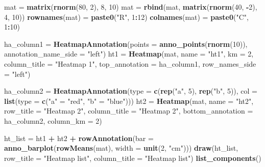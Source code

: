 \documentclass[]{book}
\newenvironment{Shaded}{\begin{snugshade}}{\end{snugshade}}
\newcommand{\KeywordTok}[1]{\textcolor[rgb]{0.13,0.29,0.53}{\textbf{#1}}}
\newcommand{\DataTypeTok}[1]{\textcolor[rgb]{0.13,0.29,0.53}{#1}}
\newcommand{\DecValTok}[1]{\textcolor[rgb]{0.00,0.00,0.81}{#1}}
\newcommand{\StringTok}[1]{\textcolor[rgb]{0.31,0.60,0.02}{#1}}
\newcommand{\OperatorTok}[1]{\textcolor[rgb]{0.81,0.36,0.00}{\textbf{#1}}}
\newcommand{\NormalTok}[1]{#1}
\theoremstyle{definition}
\theoremstyle{definition}
\theoremstyle{definition}
\theoremstyle{remark}
\begin{document}
\begin{Shaded}
\begin{Highlighting}[]
\NormalTok{mat =}\StringTok{ }\KeywordTok{matrix}\NormalTok{(}\KeywordTok{rnorm}\NormalTok{(}\DecValTok{80}\NormalTok{, }\DecValTok{2}\NormalTok{), }\DecValTok{8}\NormalTok{, }\DecValTok{10}\NormalTok{)}
\NormalTok{mat =}\StringTok{ }\KeywordTok{rbind}\NormalTok{(mat, }\KeywordTok{matrix}\NormalTok{(}\KeywordTok{rnorm}\NormalTok{(}\DecValTok{40}\NormalTok{, }\OperatorTok{-}\DecValTok{2}\NormalTok{), }\DecValTok{4}\NormalTok{, }\DecValTok{10}\NormalTok{))}
\KeywordTok{rownames}\NormalTok{(mat) =}\StringTok{ }\KeywordTok{paste0}\NormalTok{(}\StringTok{"R"}\NormalTok{, }\DecValTok{1}\OperatorTok{:}\DecValTok{12}\NormalTok{)}
\KeywordTok{colnames}\NormalTok{(mat) =}\StringTok{ }\KeywordTok{paste0}\NormalTok{(}\StringTok{"C"}\NormalTok{, }\DecValTok{1}\OperatorTok{:}\DecValTok{10}\NormalTok{)}

\NormalTok{ha_column1 =}\StringTok{ }\KeywordTok{HeatmapAnnotation}\NormalTok{(}\DataTypeTok{points =} \KeywordTok{anno_points}\NormalTok{(}\KeywordTok{rnorm}\NormalTok{(}\DecValTok{10}\NormalTok{)), }
    \DataTypeTok{annotation_name_side =} \StringTok{"left"}\NormalTok{)}
\NormalTok{ht1 =}\StringTok{ }\KeywordTok{Heatmap}\NormalTok{(mat, }\DataTypeTok{name =} \StringTok{"ht1"}\NormalTok{, }\DataTypeTok{km =} \DecValTok{2}\NormalTok{, }\DataTypeTok{column_title =} \StringTok{"Heatmap 1"}\NormalTok{, }
    \DataTypeTok{top_annotation =}\NormalTok{ ha_column1, }\DataTypeTok{row_names_side =} \StringTok{"left"}\NormalTok{)}

\NormalTok{ha_column2 =}\StringTok{ }\KeywordTok{HeatmapAnnotation}\NormalTok{(}\DataTypeTok{type =} \KeywordTok{c}\NormalTok{(}\KeywordTok{rep}\NormalTok{(}\StringTok{"a"}\NormalTok{, }\DecValTok{5}\NormalTok{), }\KeywordTok{rep}\NormalTok{(}\StringTok{"b"}\NormalTok{, }\DecValTok{5}\NormalTok{)),}
    \DataTypeTok{col =} \KeywordTok{list}\NormalTok{(}\DataTypeTok{type =} \KeywordTok{c}\NormalTok{(}\StringTok{"a"}\NormalTok{ =}\StringTok{ "red"}\NormalTok{, }\StringTok{"b"}\NormalTok{ =}\StringTok{ "blue"}\NormalTok{)))}
\NormalTok{ht2 =}\StringTok{ }\KeywordTok{Heatmap}\NormalTok{(mat, }\DataTypeTok{name =} \StringTok{"ht2"}\NormalTok{, }\DataTypeTok{row_title =} \StringTok{"Heatmap 2"}\NormalTok{, }\DataTypeTok{column_title =} \StringTok{"Heatmap 2"}\NormalTok{,}
    \DataTypeTok{bottom_annotation =}\NormalTok{ ha_column2, }\DataTypeTok{column_km =} \DecValTok{2}\NormalTok{)}

\NormalTok{ht_list =}\StringTok{ }\NormalTok{ht1 }\OperatorTok{+}\StringTok{ }\NormalTok{ht2 }\OperatorTok{+}\StringTok{ }\KeywordTok{rowAnnotation}\NormalTok{(}\DataTypeTok{bar =} \KeywordTok{anno_barplot}\NormalTok{(}\KeywordTok{rowMeans}\NormalTok{(mat), }\DataTypeTok{width =} \KeywordTok{unit}\NormalTok{(}\DecValTok{2}\NormalTok{, }\StringTok{"cm"}\NormalTok{)))}
\KeywordTok{draw}\NormalTok{(ht_list, }\DataTypeTok{row_title =} \StringTok{"Heatmap list"}\NormalTok{, }\DataTypeTok{column_title =} \StringTok{"Heatmap list"}\NormalTok{)}
\KeywordTok{list_components}\NormalTok{()}
\end{Highlighting}
\end{Shaded}
\end{document}
